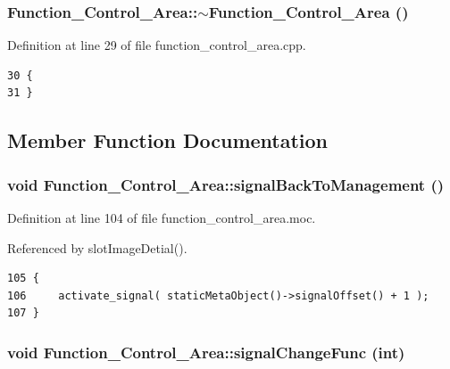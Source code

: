 \subsubsection{\setlength{\rightskip}{0pt plus 5cm}Function\_\-Control\_\-Area::$\sim${\bf Function\_\-Control\_\-Area} ()}\label{classFunction__Control__Area_Function__Control__Areaa2}




Definition at line 29 of file function\_\-control\_\-area.cpp.



\footnotesize\begin{verbatim}30 {
31 }
\end{verbatim}\normalsize 


\subsection{Member Function Documentation}
\subsubsection{\setlength{\rightskip}{0pt plus 5cm}void Function\_\-Control\_\-Area::signal\-Back\-To\-Management ()\hspace{0.3cm}{\tt  [signal]}}\label{classFunction__Control__Area_Function__Control__Areal1}




Definition at line 104 of file function\_\-control\_\-area.moc.

Referenced by slot\-Image\-Detial().



\footnotesize\begin{verbatim}105 {
106     activate_signal( staticMetaObject()->signalOffset() + 1 );
107 }
\end{verbatim}\normalsize 
{}
\subsubsection{\setlength{\rightskip}{0pt plus 5cm}void Function\_\-Control\_\-Area::signal\-Change\-Func (int)\hspace{0.3cm}{\tt  [signal]}}\label{classFunction__Control__Area_Function__Control__Areal0}




